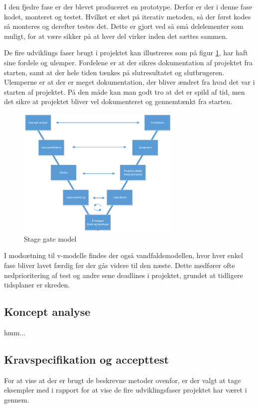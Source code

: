 I den fjedre fase er der blevet produceret en prototype. Derfor er der i denne fase kodet, monteret og testet. Hvilket er sket på iterativ metoden, så der først kodes så monteres og derefter testes det. Dette er gjort ved så små delelementer som muligt, for at være sikker på at hver del virker inden det sættes sammen. 

De fire udviklings faser brugt i projektet kan illustreres som på figur \ref{fig:v-model}, har haft sine fordele og ulemper. Fordelene er at der sikres dokumentation af projektet fra starten, samt at der hele tiden tænkes på slutresultatet og slutbrugeren. Ulemperne er at der er meget dokumentation, der bliver ændret fra hvad det var i starten af projektet. På den måde kan man godt tro at det er spild af tid, men det sikre at projektet bliver vel dokumenteret og gennemtænkt fra starten.

\begin{figure}[H]
	\centering
	\includegraphics[width=0.7\textwidth]{billeder/Hovedrapport/V-model.PDF}
	\caption{Stage gate model}
	\label{fig:v-model}
\end{figure}

I modsætning til v-modelle findes der også vandfaldsmodellen, hvor hver enkel fase bliver lavet færdig før der gås videre til den næste. Dette medfører ofte nedprioritering af test og andre sene deadlines i projektet, grundet at tidligere tidsplaner er skreden.

\subsection{Koncept analyse}
hmm...
 
\subsection{Kravspecifikation og accepttest}
For at vise at der er brugt de beskrevne metoder ovenfor, er der valgt at tage eksempler med i rapport for at vise de fire udviklingsfaser projektet har været i gennem.

